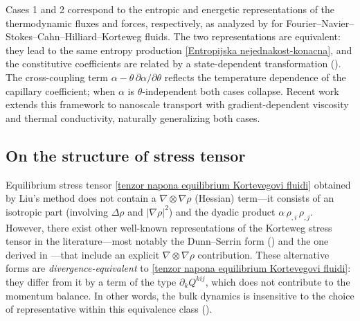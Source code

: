 \documentclass[a4paper,fleqn]{cas-sc}
\theoremstyle{definition}
\begin{document}
Cases 1 and 2 correspond to the entropic and energetic representations of the thermodynamic fluxes and forces, respectively, as analyzed by \cite{van2020variational} for Fourier--Navier--Stokes--Cahn--Hilliard--Korteweg fluids. The two representations are equivalent: they lead to the same entropy production \eqref{Entropijska nejednakost-konacna}, and the constitutive coefficients are related by a state-dependent transformation (\cite{van2020variational}). The cross-coupling term $\alpha - \theta\,\partial\alpha/\partial\theta$ reflects the temperature dependence of the capillary coefficient; when $\alpha$ is $\theta$-independent both cases collapse. Recent work \cite{bhattacharjee2025thermodynamically} extends this framework to nanoscale transport with gradient-dependent viscosity and thermal conductivity, naturally generalizing both cases. 

\subsection{On the structure of stress tensor} \label{Sec:Stress}

Equilibrium stress tensor \eqref{tenzor napona equilibrium Kortevegovi fluidi} obtained by Liu's method does not contain a $\nabla\otimes\nabla\rho$ (Hessian) term---it consists of an isotropic part (involving $\Delta\rho$ and $|\nabla\rho|^2$) and the dyadic product $\alpha\,\rho_{,i}\,\rho_{,j}$. However, there exist other well-known representations of the Korteweg stress tensor in the literature---most notably the Dunn--Serrin form (\cite{dunn1985interstitial}) and the one derived in \cite{szucs2025thermodynamic}---that include an explicit $\nabla\otimes\nabla\rho$ contribution. These alternative forms are \emph{divergence-equivalent} to \eqref{tenzor napona equilibrium Kortevegovi fluidi}: they differ from it by a term of the type $\partial_k Q^{kij}$, which does not contribute to the momentum balance. In other words, the bulk dynamics is insensitive to the choice of representative within this equivalence class (\cite{van2025remarks}). 
\end{document}
